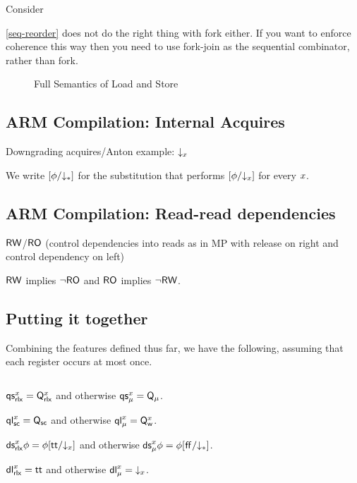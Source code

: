 Consider

\eqref{seq-reorder} does not do the right thing with fork either.  If you
want to enforce coherence this way then you need to use fork-join as the
sequential combinator, rather than fork.

\begin{figure*}
  \begin{center}
  \begin{minipage}{0.905\textwidth}
    
  \end{minipage}
  \end{center}
  \caption{Full Semantics of Load and Store}
  \label{fig:full}
\end{figure*}    


\subsection{ARM Compilation: Internal Acquires}
\label{sec:internal}
Downgrading acquires/Anton example: $\mathord{\downarrow_{x}}$


We write $[\phi/\mathord{\downarrow_{\mathtt{*}}}]$ for the substitution that performs
$[\phi/\mathord{\downarrow_{x}}]$ for every $x$.

\subsection{ARM Compilation: Read-read dependencies}
$\mathsf{RW}$/$\mathsf{RO}$ (control dependencies into reads as in MP with
release on right and control dependency on left)

$\mathsf{RW}$ implies $\lnot\mathsf{RO}$ and 
$\mathsf{RO}$ implies $\lnot\mathsf{RW}$.


\subsection{Putting it together}


Combining the features defined thus far, we have the following, assuming that
each register occurs at most once.

\begin{definition}$\phantom{\;}$\par
  
  $\mathsf{qs}_{{\mathsf{rlx}}}^{x}=\mathsf{Q}_{\mathsf{rlx}}^{x}$ and otherwise $\mathsf{qs}_{\mu}^{x}=\mathsf{Q}_{\mu}$.

  $\mathsf{ql}_{{\mathsf{sc}}}^{x}=\mathsf{Q}_{{\mathsf{sc}}}$ and otherwise $\mathsf{ql}_{\mu}^{x}=\mathsf{Q}_\mathsf{w}^{x}$.

  $\mathsf{ds}_{{\mathsf{rlx}}}^{x}{\phi}=\phi[\mathsf{tt}/\mathord{\downarrow_{x}}]$ and otherwise
  $\mathsf{ds}_{\mu}^{x}{\phi}=\phi[\mkern.6mu\mathsf{ff}\mkern.6mu/\mathord{\downarrow_{\mathtt{*}}}]$. 

  $\mathsf{dl}_{{\mathsf{rlx}}}^{x}=\mathsf{tt}$ and otherwise $\mathsf{dl}_{\mu}^{x}=\mathord{\downarrow_{x}}$.
  \smallskip
  
  
\end{definition}

